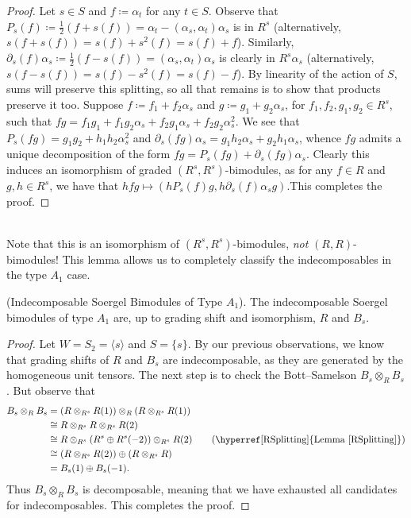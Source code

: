 \noindent\begin{proof} Let $s \in S$ and $f \coloneqq \alpha_t$ for any $t \in S$. Observe that $P_s(f) \coloneqq \frac{1}{2}(f + s(f)) = \alpha_t - (\alpha_s, \alpha_t)\alpha_s$ is in $R^s$ (alternatively, $s(f + s(f)) = s(f) + s^2(f) = s(f) + f$). Similarly, ${\partial_s(f)\alpha_s \coloneqq \frac{1}{2}(f - s(f)) = (\alpha_s, \alpha_t)\alpha_s}$ is clearly in $R^s \alpha_s$ (alternatively, $s(f - s(f)) = s(f) - s^2(f) = s(f) - f$). By linearity of the action of $S$, sums will preserve this splitting, so all that remains is to show that products preserve it too. Suppose $f \coloneqq f_1 + f_2\alpha_s$ and $g \coloneqq g_1 + g_2\alpha_s$, for $f_1, f_2, g_1, g_2 \in R^s$, such that ${fg = f_1g_1 + f_1g_2\alpha_s + f_2g_1\alpha_s + f_2g_2\alpha_s^2}$. We see that $P_s(fg) = g_1g_2 + h_1h_2\alpha_s^2$ and $\partial_s(fg)\alpha_s = g_1h_2\alpha_s + g_2h_1\alpha_s$, whence $fg$ admits a unique decomposition of the form $fg = P_s(fg) + \partial_s(fg)\alpha_s$. Clearly this induces an isomorphism of graded $(R^s, R^s)$-bimodules, as for any $f \in R$ and $g, h \in R^s$, we have that $hfg \mapsto (hP_s(f)g, h\partial_s(f)\alpha_s g)$.\linebreak This completes the proof.
\end{proof}\\

\noindent Note that this is an isomorphism of $(R^s, R^s)$-bimodules, {\em not} $(R, R)$-bimodules! This lemma allows us to completely classify the indecomposables in the type $A_1$ case.\\

\noindent\begin{proposition}\textup{(Indecomposable Soergel Bimodules of Type $A_1$).} The indecomposable Soergel bimodules of type $A_1$ are, up to grading shift and isomorphism, $R$ and $B_s$.\\
\end{proposition}

\noindent\begin{proof} Let $W = S_2 = \langle s\rangle$ and $S = \{s\}$. By our previous observations, we know that grading shifts of $R$ and $B_s$ are indecomposable, as they are generated by the homogeneous unit tensors. The next step is to check the Bott--Samelson $B_s \otimes_R B_s$. But observe that
\begin{align*}
B_s \otimes_R B_s &= (R \otimes_{R^s} R(1)) \otimes_R (R \otimes_{R^s} R(1))\\
&\cong R \otimes_{R^s} R \otimes_{R^s} R(2)\\
&\cong R \otimes_{R^s} (R^s \oplus R^s(-2)) \otimes_{R^s} R(2) \tag*{(\hyperref[RSplitting]{Lemma \ref*{RSplitting}})}\\
&\cong (R \otimes_{R^s} R(2)) \oplus (R \otimes_{R^s} R)\\
&= B_s(1) \oplus B_s(-1).
\end{align*}
\noindent Thus $B_s \otimes_R B_s$ is decomposable, meaning that we have exhausted all candidates for indecomposables. This completes the proof.
\end{proof}\\

